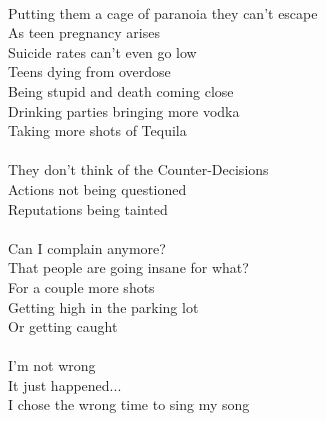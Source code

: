 \documentclass[12pt, b5paper, oneside]{book}
\begin{document}
\\Putting them a cage of paranoia they can't escape
\\As teen pregnancy arises
\\Suicide rates can't even go low
\\Teens dying from overdose
\\Being stupid and death coming close
\\Drinking parties bringing more vodka
\\Taking more shots of Tequila
%
\\\\They don't think of the Counter-Decisions
\\Actions not being questioned
\\Reputations being tainted
%
\\\\Can I complain anymore?
\\That people are going insane for what?
\\For a couple more shots
\\Getting high in the parking lot
\\Or getting caught
%
\\\\I'm not wrong
\\It just happened...
\\I chose the wrong time to sing my song 
\newpage
\end{document}
